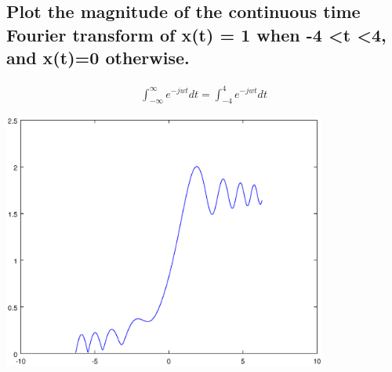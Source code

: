 \documentclass[12pt,a4paper]{article}
\begin{document}
\subsection{Plot the magnitude of the continuous time Fourier transform of x(t) = 1  when -4 \textless t \textless 4, and x(t)=0 otherwise.} 
\begin{gather*}
\int_{-\infty}^{\infty}e^{-jwt}dt
=\int_{-4}^{4}e^{-jwt}dt
\end{gather*}

\includegraphics[width=0.8\textwidth]{4.eps}
\end{document}
